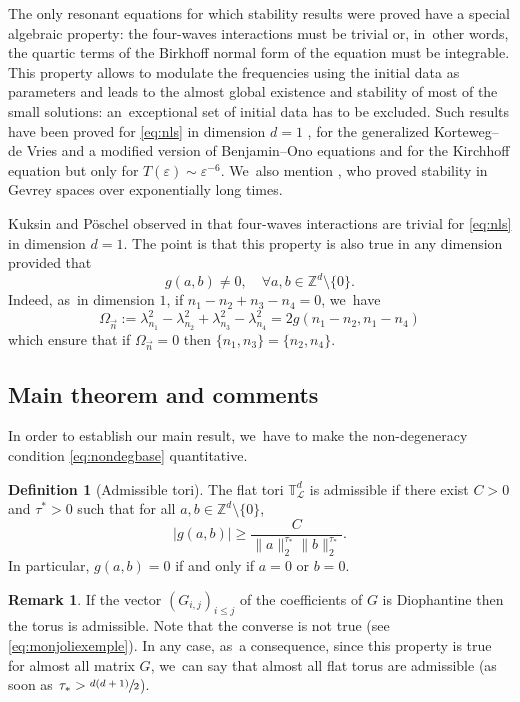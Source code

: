 \documentclass[JEP,XML,SOM,Unicode,published]{cedram}
\theoremstyle{plain}
\theoremstyle{definition}
\newtheorem{definition}[theorem]{Definition}
\newtheorem{remark}[theorem]{Remark}
\newcommand{\1}{\mathbf{1}}
\begin{document}
The only resonant equations for which stability results were proved have a special algebraic property: the four-waves interactions must be trivial or, in~other words, the quartic terms of the Birkhoff normal form of the equation must be integrable. This property allows to modulate the frequencies using the initial data as parameters and leads to the almost global existence and stability of most of the small solutions: an~exceptional set of initial data has to be excluded. Such results have been proved for \eqref{eq:nls} in dimension $d=1$ \cite{Bou00,KillBill}, for the generalized Korteweg--de Vries and a modified version of Benjamin--Ono equations \cite{KtA} and for the Kirchhoff equation \cite{BH22} but only for $T(\varepsilon)\sim \varepsilon^{-6}$. We~also mention \cite{LX23,zhiqiang}, who proved stability in Gevrey spaces over exponentially long times.

Kuksin and Pöschel observed in \cite{Kuksin-Poschel} that four-waves interactions are trivial for \eqref{eq:nls} in dimension $d=1$. The point is that this property is also true in any dimension provided that
\begin{equation}
\label{eq:nondegbase}
g(a,b) \neq 0, \quad \forall a,b \in \mathbb{Z}^d \setminus \{0\}.
\end{equation}
Indeed, as~in dimension $1$, if $n_1-n_2+n_3-n_4 = 0$, we~have
\[
\Omega_{\vec{n}}:= \lambda_{n_1}^2 - \lambda_{n_2}^2 + \lambda_{n_3}^2 - \lambda_{n_4}^2 = 2 g(n_1-n_2,n_1-n_4)
\]
which ensure that if $ \Omega_{\vec{n}}=0$ then $\{n_1,n_3\} = \{n_2,n_4\}$.

\subsection{Main theorem and comments}

In order to establish our main result, we~have to make the non-degeneracy condition \eqref{eq:nondegbase} quantitative.
\begin{definition}[Admissible tori]\label{def:tori} The flat tori $\mathbb{T}^d_{\mathscr{L}}$ is admissible if there exist $C>0$ and $\tau^{\ast}>0$ such that for all $a,b \in \mathbb{Z}^{d} \setminus \{0\}$,
\begin{equation}
\label{eq:adm}
|g(a,b)| \geq \frac{C}{\|a\|_{2}^{\tau_{\ast}}\|b\|_{2}^{\tau_{\ast}}}.
\end{equation}
In particular, $g(a,b)=0$ if and only if $a=0$ or $b=0$.
\end{definition}

\begin{remark}
If the vector $(G_{i,j})_{i\leq j}$ of the coefficients of $G$ is Diophantine then the torus is admissible. Note that the converse is not true (see \eqref{eq:monjoliexemple}). In any case, as~a consequence, since this property is true for almost all matrix $G$, we~can say that almost all flat torus are admissible (as soon as $\tau_\ast > \sfrac{d(d+1)}{2}$).
\end{remark}
\end{document}
